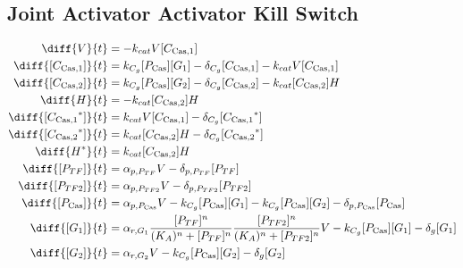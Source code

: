 \subsection{Joint Activator Activator Kill Switch}
\label{s:Joint_Activator_Activator_Kill_Switch}

\begin{align}
\diff{\vectorGen{}}{t} & = - \casCutRate{{}}\vectorGen{}\conc{\cplx{\cas}{1}}\\
\diff{\conc{\cplx{\cas}{1}}}{t} & =  \gRnaBind{}\conc{\proSp{\cas{}}}\conc{\gRna{1}} - \casCompDegradeRate{}\conc{\cplx{\cas}{1}} - \casCutRate{{}}\vectorGen{}\conc{\cplx{\cas}{1}}\\
\diff{\conc{\cplx{\cas}{2}}}{t} & =  \gRnaBind{}\conc{\proSp{\cas{}}}\conc{\gRna{2}} - \casCompDegradeRate{}\conc{\cplx{\cas}{2}} - \casCutRate{{}}\conc{\cplx{\cas}{2}}\hostGen{}\\
\diff{\hostGen{}}{t} & = - \casCutRate{{}}\conc{\cplx{\cas}{2}}\hostGen{}\\
\diff{\conc{\bound{\cplx{\cas}{1}}}}{t} & =  \casCutRate{{}}\vectorGen{}\conc{\cplx{\cas}{1}} - \casCompDegradeRate{}\conc{\bound{\cplx{\cas}{1}}}\\
\diff{\conc{\bound{\cplx{\cas}{2}}}}{t} & =  \casCutRate{{}}\conc{\cplx{\cas}{2}}\hostGen{} - \casCompDegradeRate{}\conc{\bound{\cplx{\cas}{2}}}\\
\diff{\edited{\hostGen{}}}{t} & =  \casCutRate{{}}\conc{\cplx{\cas}{2}}\hostGen{}\\
\diff{\conc{\proSp{TF}}}{t} & =  \txtlRate{\proSp{TF}}\vectorGen{} - \proDegradeRate{\proSp{TF}}\conc{\proSp{TF}}\\
\diff{\conc{\proSp{TF2}}}{t} & =  \txtlRate{\proSp{TF2}}\vectorGen{} - \proDegradeRate{\proSp{TF2}}\conc{\proSp{TF2}}\\
\diff{\conc{\proSp{\cas{}}}}{t} & =  \txtlRate{\proSp{\cas{}}}\vectorGen{} - \gRnaBind{}\conc{\proSp{\cas{}}}\conc{\gRna{1}} - \gRnaBind{}\conc{\proSp{\cas{}}}\conc{\gRna{2}} - \proDegradeRate{\proSp{\cas{}}}\conc{\proSp{\cas{}}}\\
\diff{\conc{\gRna{1}}}{t} & =  \txRate{\gRna{1}}\frac{\conc{\proSp{TF}}^n}{(K_A)^n + \conc{\proSp{TF}}^n}\frac{\conc{\proSp{TF2}}^n}{(K_A)^n + \conc{\proSp{TF2}}^n}\vectorGen{} - \gRnaBind{}\conc{\proSp{\cas{}}}\conc{\gRna{1}} - \rnaDegradeRate{}\conc{\gRna{1}}\\
\diff{\conc{\gRna{2}}}{t} & =  \txRate{\gRna{2}}\vectorGen{} - \gRnaBind{}\conc{\proSp{\cas{}}}\conc{\gRna{2}} - \rnaDegradeRate{}\conc{\gRna{2}}
\end{align}

